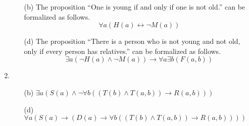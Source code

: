 \documentclass[fleqn]{article}
\begin{document}
\begin{enumerate}
\begin{enumerate}
		\item[(b)]
		The proposition ``One is young if and only if one is not old.'' can be formalized as follows.
		\[\forall a (H(a) \leftrightarrow \lnot M(a))\]

		\item [(d)]
		The proposition ``There is a person who is not young and not old, only if every person has relatives.'' can be formalized as follows.
		\[\exists a (\lnot H(a) \land \lnot M(a)) \to \forall a \exists b (F(a, b))\]
	\end{enumerate}

	\item %
	\begin{enumerate}
		\item[(b)]
		\(\exists a (S(a) \land \lnot \forall b ((T(b) \land T(a, b)) \to R(a, b)))\)

		\item[(d)]
		\(\forall a (S(a) \to (D(a) \to \forall b ((T(b) \land T(a, b)) \to R(a, b))))\)
	\end{enumerate}
\end{enumerate}
    
\end{document}
